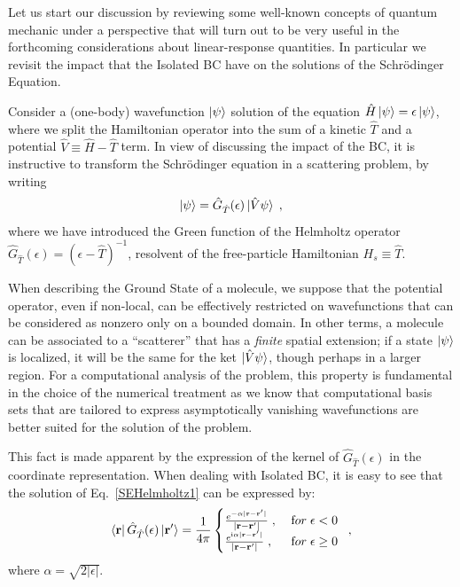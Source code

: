 \documentclass[reprint,aps,prb]{revtex4-1}
\renewcommand{\r}{{\bf r}}
\newcommand{\eps}{\epsilon}
\newcommand{\ii}{\mathrm{i}}
\newcommand{\be}{\begin{equation}}
\newcommand{\ee}{\end{equation}}
\newcommand{\lb}{\label}
\newcommand{\op}[1]{\hat {#1}}
\newcommand{\GH}{\op G_{\op T}}
\begin{document}
Let us start our discussion by reviewing some well-known concepts of quantum mechanic under a perspective that will turn out to be very useful
in the forthcoming considerations about linear-response quantities. In particular we revisit the impact that the Isolated BC have on the solutions
of the Schr\"odinger Equation.

Consider a (one-body) wavefunction $\ket{\psi}$ solution of the equation
$\op H\ket{\psi}=\eps\ket{\psi}$, where we split the Hamiltonian operator into the sum of
a kinetic $\op T$ and a potential $\op V \equiv \op H - \op T$ term.
In view of discussing the impact of the BC, it is instructive to transform
the Schr\"odinger equation in a scattering problem, by writing
\be\lb{SEHelmholtz1}
\ket{\psi} = \GH(\eps)\ket{\op V\psi}\;,
\ee
where we have introduced the Green function of the Helmholtz operator $\GH(\eps) = (\eps-\op T)^{-1}$,
resolvent of the free-particle Hamiltonian $H_s \equiv \op T$.

When describing the Ground State of a molecule, we suppose that the potential operator, even if non-local,
can be effectively restricted on wavefunctions that can be considered as nonzero only on a
bounded domain. In other terms, a molecule can be associated to a ``scatterer'' that has a \emph{finite}
spatial extension; if a state $\ket{\psi}$ is localized, it will be the same for the ket $\ket{\op V \psi}$, though
perhaps in a larger region.
For a computational analysis of the problem, this property is fundamental in the choice of the numerical treatment as we know that
computational basis sets
that are tailored to express asymptotically vanishing wavefunctions are better suited for the solution of the problem.

This fact is made apparent by the expression of
the kernel of $\GH(\eps)$ in the coordinate representation.
When dealing with Isolated BC, it is easy to see that the solution of Eq.~\eqref{SEHelmholtz1}
can be expressed by:
\be\lb{HelmholtzKernelDef1}
\bra{\r} \GH(\eps) \ket{\r'} = \frac{1}{4\pi} \begin{cases}
\frac{e^{-\alpha|\r - \r' |}}{|\r- \r' |} \;,\; & {\textrm for}\; \eps  < 0\; \\
\frac{e^{\ii \alpha |\r-\r' |}}{|\r-\r' |} \;, & {\textrm for} \; \eps \geq 0
\end{cases} \;,
\ee
where $\alpha = \sqrt{2|\eps|}$.
\end{document}
